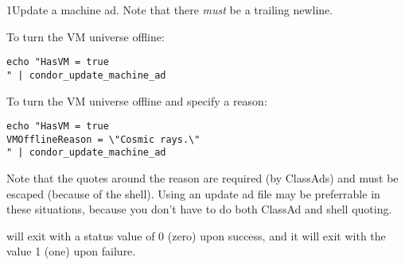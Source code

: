 \begin{ManPage}{}{1}{Update a machine ad.}
Note that there \emph{must} be a trailing newline.

To turn the VM universe offline:

\begin{verbatim}
echo "HasVM = true
" | condor_update_machine_ad
\end{verbatim}

To turn the VM universe offline and specify a reason:

\begin{verbatim}
echo "HasVM = true
VMOfflineReason = \"Cosmic rays.\"
" | condor_update_machine_ad
\end{verbatim}

Note that the quotes around the reason are required (by ClassAds) and must
be escaped (because of the shell).  Using an update ad file may be preferrable
in these situations, because you don't have to do both ClassAd and shell
quoting.

\ExitStatus

 will exit with a status value of 0 (zero) upon
success, and it will exit with the value 1 (one) upon failure.

\end{ManPage}
